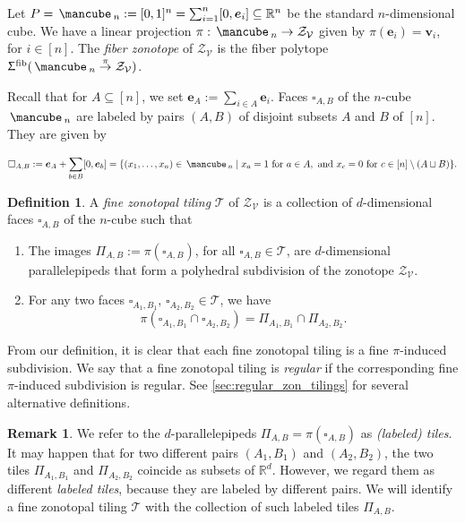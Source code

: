 \documentclass[11pt]{amsart}
\theoremstyle{plain}
\theoremstyle{definition}
\newtheorem{definition}[theorem]{Definition}
\newtheorem{remark}[theorem]{Remark}
\def\R{\mathbb{R}}
\def\v{{\bm{v}}}
\def\V{\mathcal{V}}
\def\e{{\bm{e}}}
\def\Zon{\mathcal{Z}}
\def\ZV{\Zon_\V}
\def\cube{\mbox{\,\mancube\,}}
\def\fiber{{\operatorname{fib}}}
\def\FibPoly{\Upsigma^\fiber}
\def\pito{\overset \pi \to}
\def\VC{\V}
\def\Tcal{\mathcal{T}}
\def\Tiling{\Tcal}
\def\tile{\Pi}
\let\subset\subseteq
\begin{document}
Let $P = \cube_n:=[0,1]^n = \sum_{i=1}^n [0,\e_i]\subset \R^n$ 
be the standard $n$-dimensional cube.
We have a linear projection $\pi:\cube_n\to\Zon_\V$ given by  
 $\pi(\e_i) = \v_i$, for $i\in [n]$.
The \emph{fiber zonotope} of $\ZV$ is the fiber polytope $\FibPoly(\cube_n\pito \Zon_\VC)$. 




 Recall that for $A\subset[n]$, we set $\e_A:=\sum_{i\in A} \e_i$.
Faces
$\square_{A,B}$ of the $n$-cube $\cube_n$ are labeled by pairs 
$(A,B)$ of disjoint subsets $A$ and $B$ of $[n]$.  They are given by 


\[\square_{A,B} := \e_A + \sum_{b\in B} [0,\e_b] = \{(x_1,\dots,x_n)\in\cube_n \mid x_a = 
1\textrm{ for } a\in A, \textrm{ and } 
x_c = 0 \textrm{ for } c \in [n]\setminus (A\sqcup B)\}.\]



\begin{definition}\label{def:finetiling}
A \emph{fine zonotopal tiling} $\Tiling$ of $\Zon_\V$ is a collection 
of $d$-dimensional faces $\square_{A,B}$ of the $n$-cube such 
that
\begin{enumerate}
\item The images $\tile_{A,B}:=\pi(\square_{A,B})$, for all $\square_{A,B}\in
\Tiling$, 
are $d$-dimensional parallelepipeds that 
form a polyhedral subdivision of the zonotope $\Zon_\V$.  
\item 
For any two faces $\square_{A_1,B_1},\, \square_{A_2,B_2}\in \Tiling$, we have 
$$
\pi(\square_{A_1,B_1}\cap \square_{A_2,B_2}) = \tile_{A_1,B_1} \cap \tile_{A_2,B_2}.
$$
\end{enumerate}
\end{definition}

From our definition, it is clear that each fine zonotopal tiling is a fine $\pi$-induced subdivision. We say that a fine zonotopal tiling is \emph{regular} if the corresponding fine $\pi$-induced subdivision is regular. See \cref{sec:regular_zon_tilings} for several alternative definitions.

\begin{remark}\label{rmk:labeled}
We refer to the $d$-parallelepipeds $\tile_{A,B}=\pi(\square_{A,B})$ 
	as \emph{(labeled) tiles}.
It may happen that 
for two different pairs $(A_1,B_1)$ and $(A_2,B_2)$, 
the two tiles $\tile_{A_1,B_1}$ and $\tile_{A_2, B_2}$ 
coincide as subsets of $\R^d$.   
However, we regard them as different
\emph{labeled tiles}, because they are labeled by different pairs. 
We will identify a fine zonotopal tiling $\Tiling$ with the collection
of such labeled tiles $\tile_{A,B}$. 
\end{remark}
\end{document}

